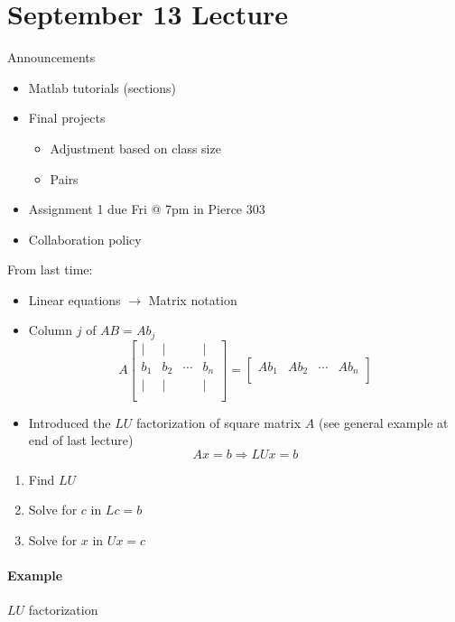 \section{September 13 Lecture}

Announcements

\begin{itemize}
  \item Matlab tutorials (sections)
  \item Final projects
  \begin{itemize}
    \item Adjustment based on class size
    \item Pairs
  \end{itemize}
  \item Assignment 1 due Fri @ 7pm in Pierce 303
  \item Collaboration policy
\end{itemize}

From last time:

\begin{itemize}
  \item Linear equations $\rightarrow$ Matrix notation
  \item Column $j$ of $AB=Ab_j$
  \[
    A
    \begin{bmatrix}
      | & | &  & | \\
      b_1 & b_2 & \cdots & b_n \\
      | & | &  & | \\
    \end{bmatrix} = 
    \begin{bmatrix}
      Ab_1 & Ab_2 & \cdots & Ab_n \\
    \end{bmatrix} 
  \]
  \item Introduced the $LU$ factorization of square matrix $A$ (see general example at end of last lecture)
  \[
    Ax=b \Rightarrow LUx = b
  \]
\end{itemize}

\begin{enumerate}
  \item Find $LU$
  \item Solve for $c$ in $Lc=b$
  \item Solve for $x$ in $Ux=c$
\end{enumerate}

\paragraph{Example} $LU$ factorization

